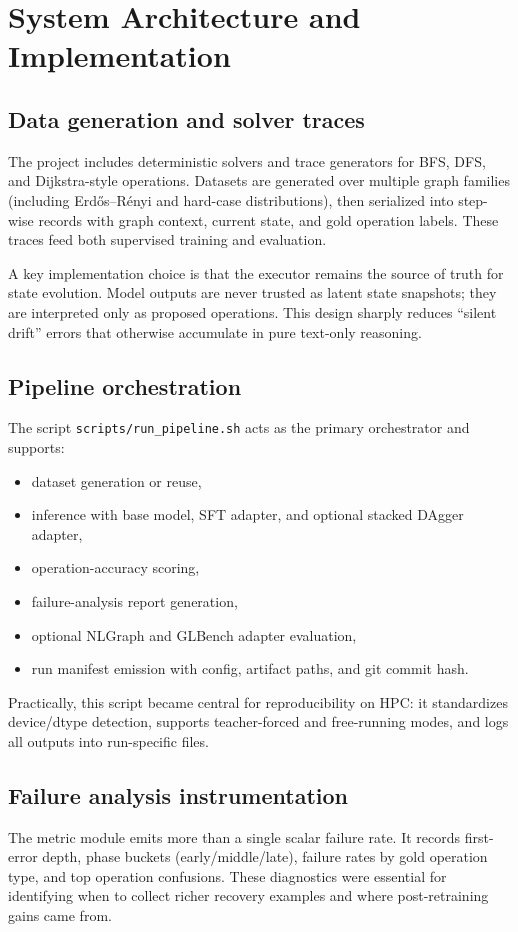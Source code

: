 \documentclass[sigplan,screen]{acmart}
\begin{document}
\section{System Architecture and Implementation}
\subsection{Data generation and solver traces}
The project includes deterministic solvers and trace generators for BFS, DFS, and Dijkstra-style operations.
Datasets are generated over multiple graph families (including Erd\H{o}s--R\'enyi and hard-case distributions), then serialized into step-wise records with graph context, current state, and gold operation labels.
These traces feed both supervised training and evaluation.

A key implementation choice is that the executor remains the source of truth for state evolution.
Model outputs are never trusted as latent state snapshots; they are interpreted only as proposed operations.
This design sharply reduces ``silent drift'' errors that otherwise accumulate in pure text-only reasoning.

\subsection{Pipeline orchestration}
The script \texttt{scripts/run\_pipeline.sh} acts as the primary orchestrator and supports:
\begin{itemize}
  \item dataset generation or reuse,
  \item inference with base model, SFT adapter, and optional stacked DAgger adapter,
  \item operation-accuracy scoring,
  \item failure-analysis report generation,
  \item optional NLGraph and GLBench adapter evaluation,
  \item run manifest emission with config, artifact paths, and git commit hash.
\end{itemize}

Practically, this script became central for reproducibility on HPC: it standardizes device/dtype detection, supports teacher-forced and free-running modes, and logs all outputs into run-specific files.

\subsection{Failure analysis instrumentation}
The metric module emits more than a single scalar failure rate.
It records first-error depth, phase buckets (early/middle/late), failure rates by gold operation type, and top operation confusions.
These diagnostics were essential for identifying when to collect richer recovery examples and where post-retraining gains came from.
\end{document}
